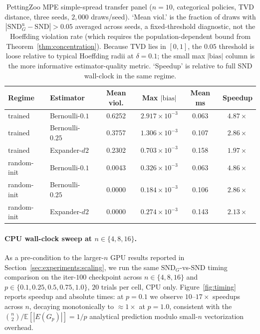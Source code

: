 \documentclass{article}
\theoremstyle{plain}
\theoremstyle{definition}
\theoremstyle{remark}
\newcommand{\E}{\mathbb{E}}
\newcommand{\SND}{\ensuremath{\mathrm{SND}}}
\newcommand{\SNDG}{\mathrm{SND}_{G}}
\begin{document}
\begin{table}[t]
\centering
\small
\begin{tabular}{llcccc}
\toprule
\textbf{Regime} & \textbf{Estimator} & \textbf{Mean viol.} & \textbf{Max $|\mathrm{bias}|$} & \textbf{Mean ms} & \textbf{Speedup} \\
\midrule
trained & Bernoulli-$0.1$ & 0.6252 & $2.917{\times}10^{-3}$ & 0.063 & $4.87\times$ \\
trained & Bernoulli-$0.25$ & 0.3757 & $1.306{\times}10^{-3}$ & 0.107 & $2.86\times$ \\
trained & Expander-$d2$ & 0.2302 & $0.703{\times}10^{-3}$ & 0.158 & $1.97\times$ \\
\midrule
random-init & Bernoulli-$0.1$ & 0.0043 & $0.326{\times}10^{-3}$ & 0.063 & $4.86\times$ \\
random-init & Bernoulli-$0.25$ & 0.0000 & $0.184{\times}10^{-3}$ & 0.106 & $2.86\times$ \\
random-init & Expander-$d2$ & 0.0000 & $0.274{\times}10^{-3}$ & 0.143 & $2.13\times$ \\
\bottomrule
\end{tabular}
\caption{PettingZoo MPE simple-spread transfer panel ($n{=}10$,
categorical policies, TVD distance, three seeds, $2{,}000$ draws/seed).
`Mean viol.' is the fraction of draws with
$|\SNDG^{\mathrm{u}}-\SND|>0.05$ averaged across seeds, a
fixed-threshold diagnostic, not the Hoeffding violation rate (which
requires the population-dependent bound from
Theorem~\ref{thm:concentration}). Because TVD lies in $[0,1]$, the
$0.05$ threshold is loose relative to typical Hoeffding radii at
$\delta{=}0.1$; the small max $|\mathrm{bias}|$ column is the more
informative estimator-quality metric. `Speedup' is relative to full SND
wall-clock in the same regime.}
\label{tab:mpe-tvd-panel}
\end{table}

\paragraph{CPU wall-clock sweep at $n\in\{4, 8, 16\}$.} As a
pre-condition to the larger-$n$ GPU results reported in
Section~\ref{sec:experiments:scaling}, we run the same
$\SNDG$-vs-$\SND$ timing comparison on the iter-$100$ checkpoint
across $n \in \{4, 8, 16\}$ and $p \in \{0.1, 0.25, 0.5, 0.75, 1.0\}$,
$20$ trials per cell, CPU only. Figure~\ref{fig:timing} reports
speedup and absolute times: at $p{=}0.1$ we observe
$10$--$17\times$ speedups across $n$, decaying monotonically to
$\approx 1\times$ at $p{=}1.0$, consistent with the
$\binom{n}{2}/\E[|E(G_p)|]=1/p$ analytical prediction modulo
small-$n$ vectorization overhead.
\end{document}
